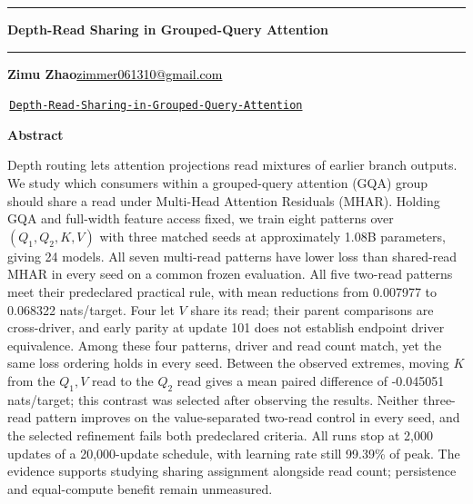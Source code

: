 \documentclass[11pt,letterpaper]{article}
\author{Zimu Zhao}
\newcommand{\paperTitleStyle}{\fontsize{13.8pt}{15.8pt}\selectfont\bfseries}
\newcommand{\frontMatterTitleStyle}{\fontsize{15.15pt}{17.2pt}\selectfont\bfseries}
\newcommand{\TwoReadWeakGain}{0.007977}
\newcommand{\TwoReadStrongGain}{0.068322}
\newcommand{\LastLRPercent}{99.39}
\newcommand{\WithinDriverMean}{-0.045051}
\begin{document}
\begin{center}
  \rule{\textwidth}{1.8pt}\par
  \vspace{0.9em}
  {\paperTitleStyle Depth-Read Sharing in Grouped-Query Attention\par}
  \vspace{0.9em}
  \rule{\textwidth}{1.8pt}\par
  \vspace{0.5em}
  {\textbf{Zimu Zhao}\quad\href{mailto:zimmer061310@gmail.com}{\textcolor{black}{zimmer061310@gmail.com}}\par}
  {\faGithub\,\href{https://github.com/Zimmer061310/Depth-Read-Sharing-in-Grouped-Query-Attention}{\texttt{Depth-Read-Sharing-in-Grouped-Query-Attention}}\par}
\end{center}

\begin{center}
  {\frontMatterTitleStyle Abstract}
\end{center}
Depth routing lets attention projections read mixtures of earlier branch
outputs. We study which consumers within a grouped-query attention (GQA)
group should share a read under Multi-Head Attention Residuals (MHAR).
Holding GQA and full-width feature access fixed, we train eight patterns
over $(Q_1,Q_2,K,V)$ with three matched seeds at approximately 1.08B parameters,
giving 24 models. All seven multi-read patterns have lower loss than shared-read
MHAR in every seed on a common frozen evaluation. All five two-read patterns
meet their predeclared practical rule, with mean reductions from
\TwoReadWeakGain{} to \TwoReadStrongGain{} nats/target. Four let $V$ share its read;
their parent comparisons are cross-driver, and early parity at update 101
does not establish endpoint driver equivalence. Among these four patterns,
driver and read count match, yet the same loss ordering holds in every seed.
Between the observed extremes, moving $K$ from the $Q_1,V$ read to the
$Q_2$ read gives a mean paired difference of \WithinDriverMean{} nats/target;
this contrast was selected after observing the results.
Neither three-read pattern improves on the value-separated two-read control
in every seed, and the selected refinement fails both predeclared criteria.
All runs stop at 2,000 updates of a 20,000-update schedule, with learning rate
still \LastLRPercent{}\% of peak. The evidence supports studying sharing assignment
alongside read count; persistence and equal-compute benefit remain unmeasured.
\end{document}
